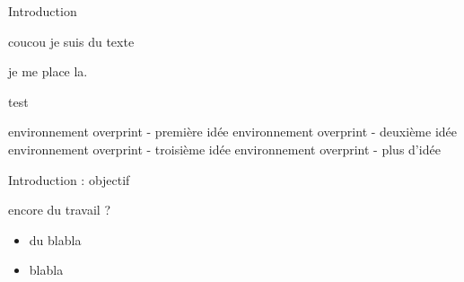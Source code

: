 \begin{frame}{Introduction}

coucou je suis du texte
\pause %

je me place la.

\end{frame}

\begin{frame}{test}
	 \begin{overprint}
		 environnement overprint - première idée 
		\onslide<2> environnement overprint - deuxième idée 
		\onslide<3> environnement overprint - troisième idée 
		\onslide<4> environnement overprint - plus d'idée 
	\end{overprint} 
\end{frame}

\begin{frame}{Introduction : objectif}

encore du travail ?

\begin{itemize}
    \item du blabla 
    \item blabla 
\end{itemize}


\end{frame}

